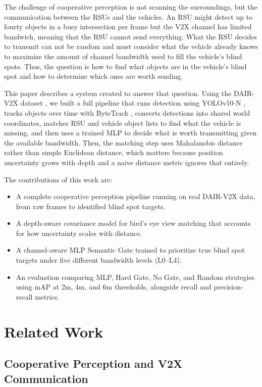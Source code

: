 \documentclass[12pt]{article}
\begin{document}
\medskip
The challenge of cooperative perception is not scanning the surroundings, but the communication between the RSUs and the vehicles. An RSU might detect up to fourty objects in a busy intersection per frame but the V2X channel has limited bandwich, meaning that the RSU cannot send everything. What the RSU decides to transmit can not be random and must consider what the vehicle already knows to maximize the amount of channel bandwidth used to fill the vehicle's blind spots. Thus, the question is how to find what objects are in the vehicle's blind spot and how to determine which ones are worth sending. 

\medskip
This paper describes a system created to answer that question. Using the DAIR-V2X dataset \cite{yu2022dairv2x}, we built a full pipeline that runs detection using YOLOv10-N \cite{wang2024yolov10}, tracks objects over time with ByteTrack \cite{zhang2022bytetrack}, converts detections into shared world coordinates, matches RSU and vehicle object lists to find what the vehicle is missing, and then uses a trained MLP to decide what is worth transmitting given the available bandwidth. Then, the matching step uses Mahalanobis distance rather than simple Euclidean distance, which matters because position uncertainty grows with depth and a naive distance metric ignores that entirely.

\medskip
The contributions of this work are:
\begin{itemize}
    \item A complete cooperative perception pipeline running on real DAIR-V2X data, from raw frames to identified blind spot targets.
    \item A depth-aware covariance model for bird's eye view matching that accounts for how uncertainty scales with distance.
    \item A channel-aware MLP Semantic Gate trained to prioritize true blind spot targets under five different bandwidth levels (L0--L4).
    \item An evaluation comparing MLP, Hard Gate, No Gate, and Random strategies using mAP at 2m, 4m, and 6m thresholds, alongside recall and precision-recall metrics.
\end{itemize}

\section{Related Work}
\label{sec:related}

\subsection{Cooperative Perception and V2X Communication}
\end{document}
